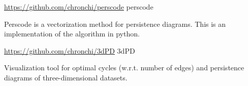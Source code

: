 \begin{cventries}
\cventry
  {\url{https://github.com/chronchi/perscode}} %
  {perscode} %
  {}{}
  {
    \begin{cvitems} %
      \item {Perscode is a vectorization method for persistence
      diagrams. This is an implementation of the algorithm in python.}
    \end{cvitems}
  }

\cventry
  {\url{https://github.com/chronchi/3dPD}} %
  {3dPD} %
  {}{}
  {
    \begin{cvitems} %
        \item {Visualization tool for optimal cycles (w.r.t. number of edges) and persistence
	       diagrams of three-dimensional datasets.}
    \end{cvitems}
  }

\end{cventries}
